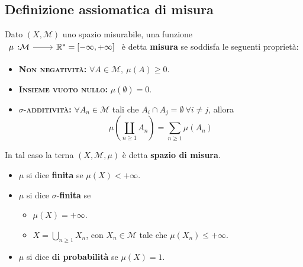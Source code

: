 \subsection{Definizione assiomatica di misura}
\begin{define}
	Dato $\left(X,\mathcal{M}\right)$ uno spazio misurabile, una funzione $\funz{\mu}{\mathcal{M}}{\realset^{\ast}=\left[-\infty,+\infty\right]}$ è detta \textbf{misura} se soddisfa le seguenti proprietà:
	\begin{itemize}
		\item \textsc{\textbf{Non negatività:}} $\forall A\in\mathcal{M},\ \mu\left(A\right)\geq 0$.
		\item \textsc{\textbf{Insieme vuoto nullo:}} $\mu\left(\emptyset\right)=0$.
		\item $\sigma$-\textsc{\textbf{additività:}} $\forall A_n\in\mathcal{M}$ tali che $A_i\cap A_j=\emptyset\ \forall i\neq j$, allora
		\begin{equation}
			\mu\left(\coprod_{n\geq 1}A_n\right)=\sum_{n\geq 1}\mu\left(A_n\right)
		\end{equation}
	\end{itemize}
	In tal caso la terna $\left(X,\mathcal{M},\mu\right)$ è detta \textbf{spazio di misura}.
	\begin{itemize}
		\item $\mu$ si dice \textbf{finita} se $\mu\left(X\right)<+\infty$.
		\item $\mu$ si dice $\sigma$-\textbf{finita} se
		\begin{itemize}
			\item $\mu\left(X\right)=+\infty$.
			\item $\displaystyle X=\bigcup_{n\geq 1}X_n$, con $X_n\in\mathcal{M}$ tale che $\mu\left(X_n\right)\leq +\infty$.
		\end{itemize}
	\item $\mu$ si dice \textbf{di probabilità} se $\mu\left(X\right)=1$.
	\end{itemize}
\end{define}
